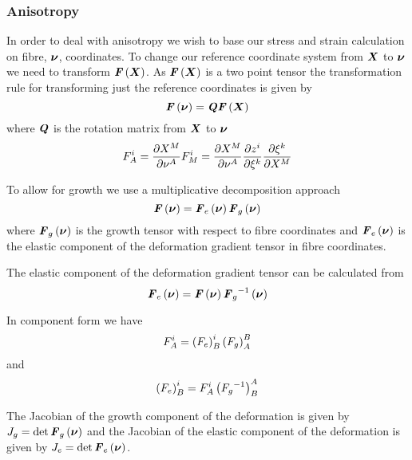 

\subsubsection{Anisotropy}

In order to deal with anisotropy we wish to base our stress and strain
calculation on fibre, $\boldsymbol{\nu}$, coordinates. To change our reference
coordinate system from $\boldsymbol{X}$ to $\boldsymbol{\nu}$ we need to transform
$ \boldsymbol{\mathit{F}}\left( \boldsymbol{X} \right) $. As $ \boldsymbol{\mathit{F}}\left( \boldsymbol{X} \right) $ is a two point tensor the transformation
rule for transforming just the reference coordinates is given by
\begin{equation}
 \boldsymbol{\mathit{F}}\left( \boldsymbol{\nu} \right) =\boldsymbol{\mathit{Q}} \boldsymbol{\mathit{F}}\left( \boldsymbol{X} \right) 
\end{equation}
where $\boldsymbol{\mathit{Q}}$ is the rotation matrix from $\boldsymbol{X}$ to $\boldsymbol{\nu}$ \ie
\begin{equation}
  F^{i}_{A}= \dfrac{\partial X^{M}}{\partial \nu^{A}} F^{i}_{M}= \dfrac{\partial X^{M}}{\partial \nu^{A}}  \dfrac{\partial z^{i}}{\partial \xi^{k}}  \dfrac{\partial \xi^{k}}{\partial X^{M}} 
\end{equation}

To allow for growth we use a multiplicative decomposition approach \ie
\begin{equation}
   \boldsymbol{\mathit{F}}\left( \boldsymbol{\nu} \right) = \boldsymbol{\mathit{F}}_{e}\left( \boldsymbol{\nu} \right)  \boldsymbol{\mathit{F}}_{g}\left( \boldsymbol{\nu} \right) 
\end{equation}
where $ \boldsymbol{\mathit{F}}_{g}\left( \boldsymbol{\nu} \right) $ is the growth tensor with
respect to fibre coordinates and $ \boldsymbol{\mathit{F}}_{e}\left( \boldsymbol{\nu} \right) $ is the
elastic component of the deformation gradient tensor in fibre coordinates.

The elastic component of the deformation gradient tensor can be calculated
from
\begin{equation}
   \boldsymbol{\mathit{F}}_{e}\left( \boldsymbol{\nu} \right) = \boldsymbol{\mathit{F}}\left( \boldsymbol{\nu} \right)  {\boldsymbol{\mathit{F}}_{g}}^{-1}\left( \boldsymbol{\nu} \right) 
\end{equation}

In component form we have
\begin{equation}
  F^{i}_{A}=\left( F_{e} \right)^{i}_{B}\left( F_{g} \right)^{B}_{A}
\end{equation}
and
\begin{equation}
  \left( F_{e} \right)^{i}_{B}=F^{i}_{A}\left( {F_{g}}^{-1} \right)^{A}_{B}
\end{equation}

The Jacobian of the growth component of the deformation is given by
$J_{g}=\det{\ensuremath{ \boldsymbol{\mathit{F}}_{g}\left( \boldsymbol{\nu} \right) }}$ and the Jacobian of the
elastic component of the deformation is given by
$J_{e}=\det{\ensuremath{ \boldsymbol{\mathit{F}}_{e}\left( \boldsymbol{\nu} \right) }}$.

